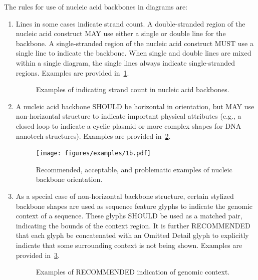 
The rules for use of nucleic acid backbones in diagrams are:
\begin{enumerate}
\item Lines in some cases indicate strand count. 
	A double-stranded region of the nucleic acid construct MAY use either a single or double line for the backbone.  
	A single-stranded region of the nucleic acid construct MUST use a single line to indicate the backbone.
	When single and double lines are mixed within a single diagram, the single lines always indicate single-stranded regions.
	Examples are provided in~\ref{exa:1a}.
	
	\begin{figure}[h!]
	\centering
	\caption{Examples of indicating strand count in nucleic acid backbones.}
	\label{exa:1a}
	\end{figure}
		
\item A nucleic acid backbone SHOULD be horizontal in orientation, 
	but MAY use non-horizontal structure to indicate important physical attributes 
	(e.g., a closed loop to indicate a cyclic plasmid or more complex shapes for DNA nanotech structures).   
	Examples are provided in~\ref{exa:1b}.
	
	\begin{figure}[h!]
	\centering
	\texttt{[image: figures/examples/1b.pdf]}
	\caption{Recommended, acceptable, and problematic examples of nucleic backbone orientation.}
	\label{exa:1b}
	\end{figure}
	
\item As a special case of non-horizontal backbone structure, certain stylized backbone shapes are used as sequence feature glyphs to indicate the genomic context of a sequence. 
	These glyphs SHOULD be used as a matched pair, indicating the bounds of the context region.
	It is further RECOMMENDED that each glyph be concatenated with an Omitted Detail glyph to explicitly indicate that some surrounding context is not being shown. 
	Examples are provided in~\ref{exa:1c}.

	\begin{figure}[h!]
	\centering
	\caption{Examples of RECOMMENDED indication of genomic context.}
	\label{exa:1c}
	\end{figure}


\end{enumerate}
